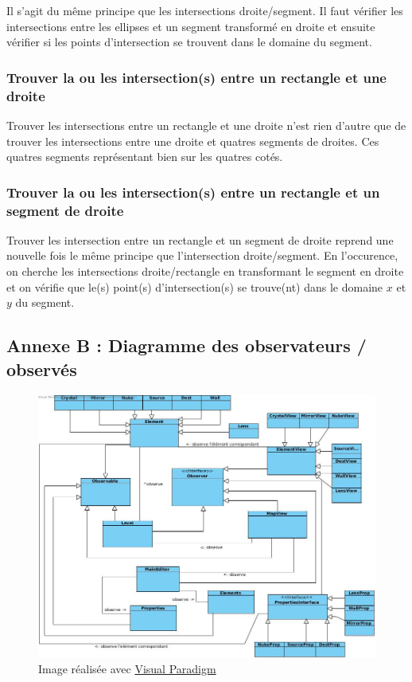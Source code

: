 \documentclass[]{report}
\begin{document}
Il s'agit du même principe que les intersections droite/segment.
Il faut vérifier les intersections entre les ellipses et un segment
transformé en droite et ensuite vérifier si les points d'intersection
se trouvent dans le domaine du segment.

\subsubsection{Trouver la ou les intersection(s) entre un rectangle et une droite}

Trouver les intersections entre un rectangle et une droite n'est rien d'autre que
de trouver les intersections entre une droite et quatres segments de droites. Ces quatres segments
représentant bien sur les quatres cotés.

\subsubsection{Trouver la ou les intersection(s) entre un rectangle et un segment de droite}

Trouver les intersection entre un rectangle et un segment de droite 
reprend une nouvelle fois le même principe que l'intersection droite/segment.
En l'occurence, on cherche les intersections droite/rectangle en transformant
le segment en droite et on vérifie que le(s) point(s) d'intersection(s) se trouve(nt)
dans le domaine $x$ et $y$ du segment.

\newpage 
\subsection{\label{AnnexeB}Annexe B : Diagramme des observateurs / observés}

\begin{figure}[hb]
\centering
\includegraphics[scale=0.4]{Obs.jpg}
\caption{Image réalisée avec \href{http://www.visual-paradigm.com/}{Visual
	Paradigm}}
\end{figure}
\end{document}

